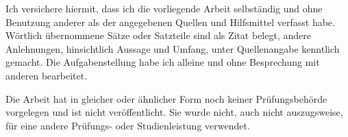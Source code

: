\documentclass[
  12pt,
]{scrartcl}
\begin{document}
Ich versichere hiermit, dass ich die vorliegende Arbeit selbständig und
ohne Benutzung anderer als der angegebenen Quellen und Hilfsmittel
verfasst habe. Wörtlich übernommene Sätze oder Satzteile sind als Zitat
belegt, andere Anlehnungen, hinsichtlich Aussage und Umfang, unter
Quellenangabe kenntlich gemacht. Die Aufgabenstellung habe ich alleine
und ohne Besprechung mit anderen bearbeitet.

Die Arbeit hat in gleicher oder ähnlicher Form noch keiner
Prüfungsbehörde vorgelegen und ist nicht veröffentlicht. Sie wurde
nicht, auch nicht auszugsweise, für eine andere Prüfungs- oder
Studienleistung verwendet.

\bigskip
\bigskip


\bigskip

\end{document}
